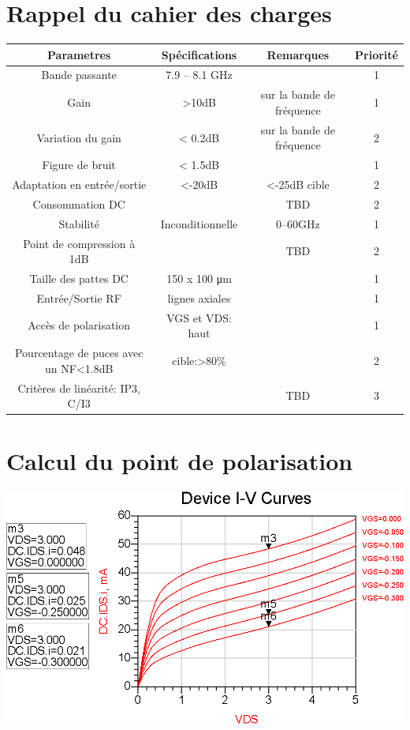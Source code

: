 \documentclass{article}
\begin{document}
\begin{centering}

\section{Rappel du cahier des charges}

\begin{tabular}{|c|c|c|c|}
    \hline
    \textbf{Parametres} & \textbf{Spécifications} & \textbf{Remarques} & \textbf{Priorité} \\
    \hline
    Bande passante & 7.9 -- 8.1 GHz & & 1 \\
    \hline
    Gain & >10dB & sur la bande de fréquence & 1 \\
    \hline
    Variation du gain & < 0.2dB & sur la bande de fréquence & 2 \\
    \hline
    Figure de bruit & < 1.5dB & & 1 \\
    \hline
    Adaptation en entrée/sortie & <-20dB & <-25dB cible & 2 \\
    \hline
    Consommation DC & & TBD & 2 \\
    \hline
    Stabilité & Inconditionnelle & 0--60GHz & 1 \\
    \hline
    Point de compression à 1dB & & TBD & 2 \\
    \hline
    Taille des pattes DC & 150 x 100 \si{\micro\meter} & & 1 \\
    \hline
    Entrée/Sortie RF & lignes axiales & & 1 \\
    \hline
    Accès de polarisation & VGS et VDS: haut & & 1 \\
    \hline
    Pourcentage de puces avec un NF<1.8dB & cible:>80\% & & 2 \\
    \hline
    Critères de linéarité: IP3, C/I3 & & TBD & 3 \\
    \hline
\end{tabular}

\newpage
\section{Calcul du point de polarisation}

\includegraphics[width=\linewidth]{polar.png}


\end{centering}
\end{document}
